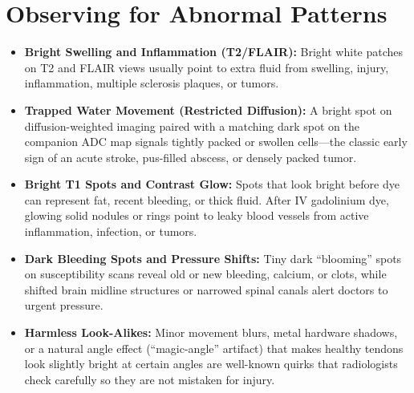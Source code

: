 \section{Observing for Abnormal Patterns}
\begin{itemize}
\item \textbf{Bright Swelling and Inflammation (T2/FLAIR):} Bright white patches on T2 and FLAIR views usually point to extra fluid from swelling, injury, inflammation, multiple sclerosis plaques, or tumors.
\item \textbf{Trapped Water Movement (Restricted Diffusion):} A bright spot on diffusion-weighted imaging paired with a matching dark spot on the companion ADC map signals tightly packed or swollen cells---the classic early sign of an acute stroke, pus-filled abscess, or densely packed tumor.
\item \textbf{Bright T1 Spots and Contrast Glow:} Spots that look bright before dye can represent fat, recent bleeding, or thick fluid. After IV gadolinium dye, glowing solid nodules or rings point to leaky blood vessels from active inflammation, infection, or tumors.
\item \textbf{Dark Bleeding Spots and Pressure Shifts:} Tiny dark ``blooming'' spots on susceptibility scans reveal old or new bleeding, calcium, or clots, while shifted brain midline structures or narrowed spinal canals alert doctors to urgent pressure.
\item \textbf{Harmless Look-Alikes:} Minor movement blurs, metal hardware shadows, or a natural angle effect (``magic-angle'' artifact) that makes healthy tendons look slightly bright at certain angles are well-known quirks that radiologists check carefully so they are not mistaken for injury.
\end{itemize}

